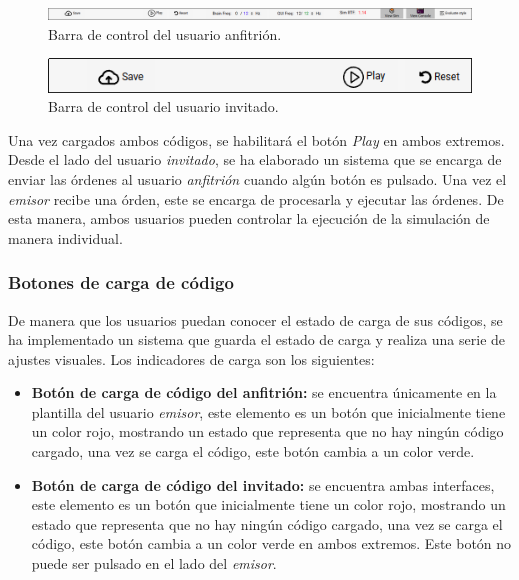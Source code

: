 \documentclass[a4paper, 12pt]{book}
\begin{document}
  \begin{figure}[H]
    \includegraphics[width=15cm]{img/host_sync_control_bar.png}
    \caption{Barra de control del usuario anfitrión.}
    \label{figura:host_sync_control_bar}
  \end{figure}
  \begin{figure}[H]
    \includegraphics[width=15cm]{img/guest_sync_control_bar.png}
    \caption{Barra de control del usuario invitado.}
    \label{figura:guest_sync_control_bar}
  \end{figure}


Una vez cargados ambos códigos, se habilitará el botón \emph{Play} en ambos extremos. Desde el lado del usuario \emph{invitado}, se ha elaborado un sistema que se encarga de enviar las órdenes al usuario \emph{anfitrión} cuando algún botón es pulsado. Una vez el \emph{emisor} recibe una órden, este se encarga de procesarla y ejecutar las órdenes. De esta manera, ambos usuarios pueden controlar la ejecución de la simulación de manera individual.

\subsubsection{Botones de carga de código}

De manera que los usuarios puedan conocer el estado de carga de sus códigos, se ha implementado un sistema que guarda el estado de carga y realiza una serie de ajustes visuales. Los indicadores de carga son los siguientes:

\begin{itemize}
\item \textbf{Botón de carga de código del anfitrión:} se encuentra únicamente en la plantilla del usuario \emph{emisor}, este elemento es un botón que inicialmente tiene un color rojo, mostrando un estado que representa que no hay ningún código cargado, una vez se carga el código, este botón cambia a un color verde.
\item \textbf{Botón de carga de código del invitado:} se encuentra ambas interfaces, este elemento es un botón que inicialmente tiene un color rojo, mostrando un estado que representa que no hay ningún código cargado, una vez se carga el código, este botón cambia a un color verde en ambos extremos. Este botón no puede ser pulsado en el lado del \emph{emisor}.
\end{itemize}
\end{document}
